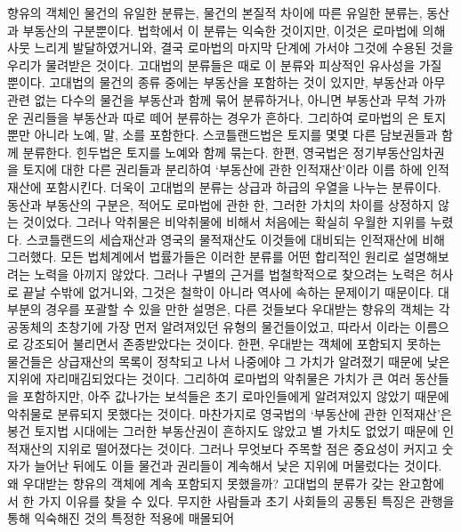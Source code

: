 향유의 객체인 물건의 유일한  분류는,
물건의 본질적 차이에 따른 유일한 분류는,
동산과 부동산의 구분뿐이다.
법학에서 이 분류는 익숙한 것이지만,
이것은 로마법에 의해 사뭇 느리게 발달하였거니와,
결국 로마법의 마지막 단계에 가서야 그것에 수용된 것을
우리가 물려받은 것이다.
고대법의 분류들은 때로 이 분류와 피상적인 유사성을 가질 뿐이다.
고대법의 물건의 종류 중에는 부동산을 포함하는 것이 있지만,
부동산과 아무 관련 없는 다수의 물건을
부동산과 함께
묶어 분류하거나,
아니면
부동산과 무척 가까운 권리들을 부동산과 따로 떼어 분류하는 경우가 흔하다.
그리하여
로마법의 은 토지뿐만 아니라 노예, 말, 소를 포함한다.
스코틀랜드법은 토지를 몇몇 다른 담보권들과 함께 분류한다.
힌두법은 토지를 노예와 함께 묶는다.
한편, 영국법은 정기부동산임차권을
토지에 대한 다른 권리들과 분리하여
`부동산에 관한 인적재산'이라 이름 하에
인적재산에 포함시킨다.
더욱이 고대법의 분류는 상급과 하급의 우열을 나누는 분류이다.
동산과 부동산의 구분은,
적어도 로마법에 관한 한,
그러한 가치의 차이를 상정하지 않는 것이었다.
그러나
악취물은 비악취물에 비해서 처음에는 확실히 우월한 지위를 누렸다.
스코틀랜드의 세습재산과
영국의 물적재산도 이것들에 대비되는 인적재산에 비해 그러했다.
모든 법체계에서 법률가들은
이러한 분류를 어떤 합리적인 원리로 설명해보려는
노력을 아끼지 않았다.
그러나 구별의 근거를 법철학적으로 찾으려는 노력은 허사로 끝날 수밖에
없거니와,
그것은 철학이 아니라 역사에 속하는 문제이기 때문이다.
대부분의 경우를 포괄할 수 있을 만한 설명은,
다른 것들보다 우대받는 향유의 객체는
각 공동체의 초창기에 가장 먼저 알려져있던 유형의 물건들이었고,
따라서 이라는 이름으로 강조되어
불리면서 존종받았다는 것이다.
한편, 우대받는 객체에 포함되지 못하는 물건들은
상급재산의 목록이 정착되고 나서 나중에야
그 가치가 알려졌기 때문에 낮은 지위에 자리매김되었다는 것이다.
그리하여 로마법의 악취물은 가치가 큰 여러 동산들을 포함하지만,
아주 값나가는 보석들은
초기 로마인들에게 알려져있지 않았기 때문에
악취물로 분류되지 못했다는 것이다.
마찬가지로 영국법의 `부동산에 관한 인적재산'은
봉건 토지법 시대에는 그러한 부동산권이 흔하지도 않았고
별 가치도 없었기 때문에 인적재산의 지위로 떨어졌다는 것이다.
그러나
무엇보다 주목할 점은
중요성이 커지고 숫자가 늘어난 뒤에도
이들 물건과 권리들이 계속해서 낮은 지위에 머물렀다는 것이다.
왜 우대받는 향유의 객체에 계속 포함되지 못했을까?
고대법의 분류가 갖는 완고함에서
한 가지 이유를
찾을 수 있다.
무지한 사람들과 초기 사회들의 공통된 특징은
관행을 통해 익숙해진 것의 특정한 적용에 매몰되어
